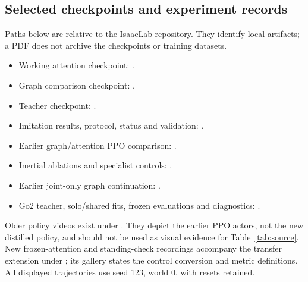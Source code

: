 \documentclass[11pt,letterpaper]{article}
\begin{document}
\subsection{Selected checkpoints and experiment records}
Paths below are relative to the IsaacLab repository. They identify local
artifacts; a PDF does not archive the checkpoints or training datasets.
\begin{itemize}
\item Working attention checkpoint:\newline
{}.
\item Graph comparison checkpoint:\newline
{}.
\item Teacher checkpoint:\newline
{}.
\item Imitation results, protocol, status and validation:\newline
{}.
\item Earlier graph/attention PPO comparison:\newline
{}.
\item Inertial ablations and specialist controls:\newline
{}.
\item Earlier joint-only graph continuation:\newline
{}.
\item Go2 teacher, solo/shared fits, frozen evaluations and diagnostics:\newline
{}.
\end{itemize}

Older policy videos exist under
. They depict the
earlier PPO actors, not the new distilled policy, and should not be used as visual
evidence for Table~\ref{tab:source}. New frozen-attention and standing-check
recordings accompany the transfer extension under
; its
 gallery states the control conversion and metric definitions.
All displayed trajectories use seed 123, world 0, with resets retained.
\end{document}
